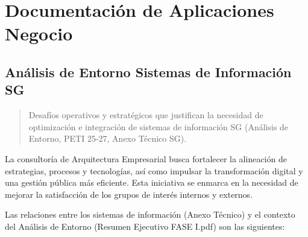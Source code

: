 \documentclass[
	a4paper, %
	12pt, %
]{include/CSSullivanBusinessReport}
\begin{document}
\newpage

\begin{twothirdswidth} %
	\tableofcontents %
\end{twothirdswidth}

\newpage


\newpage

\section{Documentación de Aplicaciones
Negocio}\label{sec:documentaciuxf3n-de-aplicaciones-negocio}

\subsection{Análisis de Entorno Sistemas de Información
SG}\label{sec:anuxe1lisis-de-entorno-sistemas-de-informaciuxf3n-sg}

\begin{quote}
Desafíos operativos y estratégicos que justifican la necesidad de
optimización e integración de sistemas de información SG (Análisis de
Entorno, PETI 25-27, Anexo Técnico SG).
\end{quote}

La consultoría de Arquitectura Empresarial busca fortalecer la
alineación de estrategias, procesos y tecnologías, así como impulsar la
transformación digital y una gestión pública más eficiente. Esta
iniciativa se enmarca en la necesidad de mejorar la satisfacción de los
grupos de interés internos y externos.

Las relaciones entre los sistemas de información (Anexo Técnico) y el
contexto del Análisis de Entorno (Resumen Ejecutivo FASE I.pdf) son las
siguientes:
\end{document}
